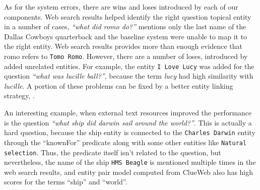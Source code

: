 As for the system errors, there are wins and loses introduced by each of our components.
Web search results helped identify the right question topical entity in a number of cases, \eg \textit{``what did romo do?''} mentions only the last name of the Dallas Cowboys quarterback and the baseline system were unable to map it to the right entity.
Web search results provides more than enough evidence that romo refers to \texttt{Tomo Romo}.
However, there are a number of loses, introduced by added unrelated entities.
For example, the entity \texttt{I Love Lucy} was added for the question \textit{``what was lucille ball?''}, because the term \textit{lucy} had high similarity with \textit{lucille}.
A portion of these problems can be fixed by a better entity linking strategy, \eg \cite{SMAPH_ERD:2014}.


An interesting example, when external text resources improved the performance is the question \textit{``what ship did darwin sail around the world?''}.
This is actually a hard question, because the ship entity is connected to the \texttt{Charles Darwin} entity through the ``knownFor'' predicate along with some other entities like \texttt{Natural selection}.
Thus, the predicate itself isn't related to the question, but nevertheless, the name of the ship \texttt{HMS Beagle} is mentioned multiple times in the web search results, and entity pair model computed from ClueWeb also has high scores for the terms ``ship'' and ``world''.

